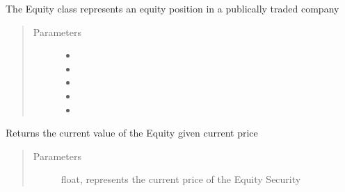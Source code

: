 \documentclass[letterpaper,10pt,english]{sphinxmanual}
\begin{document}
\begin{fulllineitems}
\label{\detokenize{securities:risk_dash.securities.Equity}}
\sphinxAtStartPar
The Equity class represents an equity position in a publically traded company
\begin{quote}\begin{description}
\item[{Parameters}] \leavevmode\begin{itemize}
\item {} 
\sphinxAtStartPar
{} \textendash{} 

\item {} 
\sphinxAtStartPar
{} \textendash{} 

\item {} 
\sphinxAtStartPar
{} \textendash{} 

\item {} 
\sphinxAtStartPar
{} \textendash{} 

\item {} 
\sphinxAtStartPar
{} \textendash{} 

\end{itemize}

\end{description}\end{quote}

\begin{fulllineitems}
\label{\detokenize{securities:risk_dash.securities.Equity.mark_to_market}}
\sphinxAtStartPar
Returns the current value of the Equity given current price
\begin{quote}\begin{description}
\item[{Parameters}] \leavevmode
\sphinxAtStartPar
{} \textendash{} float, represents the current price of the Equity Security


\end{description}
\end{quote}
\end{fulllineitems}
\end{fulllineitems}
\end{document}
